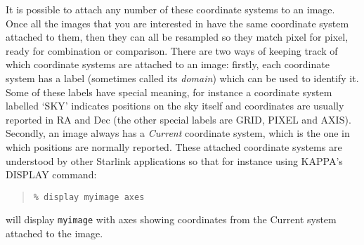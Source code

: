 \documentclass[twoside,11pt]{article}
\newcommand{\latexhtml}[2]{#1}
\newcommand{\xref}[3]{#1}
\renewcommand{\_}{\texttt{\symbol{95}}}
\newcommand{\ttsize}{\latexhtml{\small}{}}
\newenvironment{myquote}{\begin{quote}\ttsize}{\end{quote}}
\begin{document}
It is possible to attach any number of these coordinate systems 
to an image.  Once all the images that you are interested in
have the same coordinate system attached to them, then
they can all be resampled so they match pixel for pixel,
ready for combination or comparison.
There are two ways of keeping track of which coordinate systems
are attached to an image: firstly, each coordinate system has a label 
(sometimes called its {\em domain\/}) which can be used to identify it.
Some of these
labels have special meaning, for instance a coordinate system labelled 
`SKY' indicates
positions on the sky itself and coordinates are usually reported in
RA and Dec
(the other special labels are GRID, PIXEL and AXIS).
Secondly, an image
always has a {\em Current\/} coordinate system, which is the
one in which positions are normally reported.
These attached 
coordinate systems are understood by other Starlink applications
so that for instance using KAPPA's
\xref{DISPLAY}{sun95}{DISPLAY} command:
\begin{myquote}
\begin{verbatim}
% display myimage axes
\end{verbatim}
\end{myquote}
will display {\tt myimage} with axes showing coordinates from
the Current system attached to the image.
\end{document}
